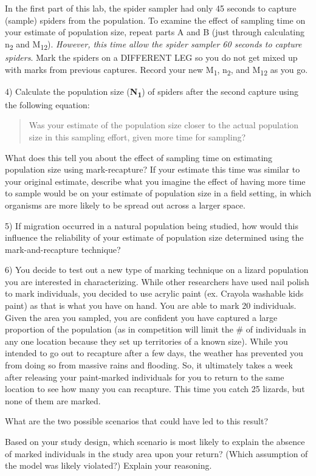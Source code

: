 In the first part of this lab, the spider sampler had only 45 seconds to
capture (sample) spiders from the population. To examine the effect of
sampling time on your estimate of population size, repeat parts A and B
(just through calculating n\textsubscript{2} and M\textsubscript{12}).
\emph{However, this time allow the spider sampler 60 seconds to capture
spiders}. Mark the spiders on a DIFFERENT LEG so you do not get mixed up
with marks from previous captures. Record your new M\textsubscript{1},
n\textsubscript{2}, and M\textsubscript{12} as you go.

4) Calculate the population size (\textbf{N\textsubscript{1}}) of
spiders after the second capture using the following equation:

\begin{quote}
Was your estimate of the population size closer to the actual population
size in this sampling effort, given more time for sampling?
\end{quote}

What does this tell you about the effect of sampling time on estimating
population size using mark-recapture? If your estimate this time was
similar to your original estimate, describe what you imagine the effect
of having more time to sample would be on your estimate of population
size in a field setting, in which organisms are more likely to be spread
out across a larger space.

5) If migration occurred in a natural population being studied, how
would this influence the reliability of your estimate of population size
determined using the mark-and-recapture technique?

6) You decide to test out a new type of marking technique on a lizard
population you are interested in characterizing. While other researchers
have used nail polish to mark individuals, you decided to use acrylic
paint (ex. Crayola washable kids paint) as that is what you have on
hand. You are able to mark 20 individuals. Given the area you sampled,
you are confident you have captured a large proportion of the population
(as in competition will limit the \# of individuals in any one location
because they set up territories of a known size). While you intended to
go out to recapture after a few days, the weather has prevented you from
doing so from massive rains and flooding. So, it ultimately takes a week
after releasing your paint-marked individuals for you to return to the
same location to see how many you can recapture. This time you catch 25
lizards, but none of them are marked.

What are the two possible scenarios that could have led to this result?

Based on your study design, which scenario is most likely to explain the
absence of marked individuals in the study area upon your return? (Which
assumption of the model was likely violated?) Explain your reasoning.
